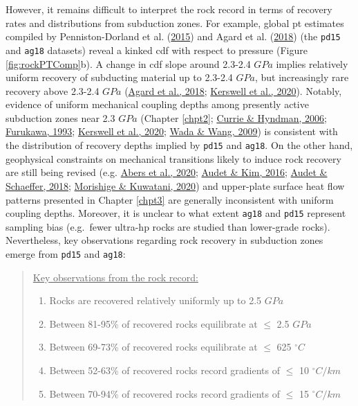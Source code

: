 However, it remains difficult to interpret the rock record in terms of recovery rates and distributions from subduction zones. For example, global \gls{pt} estimates compiled by Penniston-Dorland et al. (\protect\hyperlink{ref-penniston2015}{2015}) and Agard et al. (\protect\hyperlink{ref-agard2018}{2018}) (the \texttt{pd15} and \texttt{ag18} datasets) reveal a kinked \gls{cdf} with respect to pressure (Figure \ref{fig:rockPTComp}b). A change in \gls{cdf} slope around 2.3-2.4 \(GPa\) implies relatively uniform recovery of subducting material up to 2.3-2.4 \(GPa\), but increasingly rare recovery above 2.3-2.4 \(GPa\) (\protect\hyperlink{ref-agard2018}{Agard et al., 2018}; \protect\hyperlink{ref-kerswell2020}{Kerswell et al., 2020}). Notably, evidence of uniform mechanical coupling depths among presently active subduction zones near 2.3 \(GPa\) (Chapter \ref{chpt2}; \protect\hyperlink{ref-currie2006}{Currie \& Hyndman, 2006}; \protect\hyperlink{ref-furukawa1993}{Furukawa, 1993}; \protect\hyperlink{ref-kerswell2020}{Kerswell et al., 2020}; \protect\hyperlink{ref-wada2009}{Wada \& Wang, 2009}) is consistent with the distribution of recovery depths implied by \texttt{pd15} and \texttt{ag18}. On the other hand, geophysical constraints on mechanical transitions likely to induce rock recovery are still being revised (e.g. \protect\hyperlink{ref-abers2020}{Abers et al., 2020}; \protect\hyperlink{ref-audet2016}{Audet \& Kim, 2016}; \protect\hyperlink{ref-audet2018}{Audet \& Schaeffer, 2018}; \protect\hyperlink{ref-morishige2020}{Morishige \& Kuwatani, 2020}) and upper-plate surface heat flow patterns presented in Chapter \ref{chpt3} are generally inconsistent with uniform coupling depths. Moreover, it is unclear to what extent \texttt{ag18} and \texttt{pd15} represent sampling bias (e.g.~fewer ultra-\gls{hp} rocks are studied than lower-grade rocks). Nevertheless, key observations regarding rock recovery in subduction zones emerge from \texttt{pd15} and \texttt{ag18}:

\pagebreak

\begin{quote}
\uline{Key observations from the rock record:}

\begin{enumerate}
\def\labelenumi{\arabic{enumi}.}
\item
  Rocks are recovered relatively uniformly up to 2.5 \(GPa\)
\item
  Between 81-95\% of recovered rocks equilibrate at \(\leq\) 2.5 \(GPa\)
\item
  Between 69-73\% of recovered rocks equilibrate at \(\leq\) 625 \(^\circ C\)
\item
  Between 52-63\% of recovered rocks record gradients of \(\leq\) 10 \(^\circ C/km\)
\item
  Between 70-94\% of recovered rocks record gradients of \(\leq\) 15 \(^\circ C/km\)
\end{enumerate}
\end{quote}

